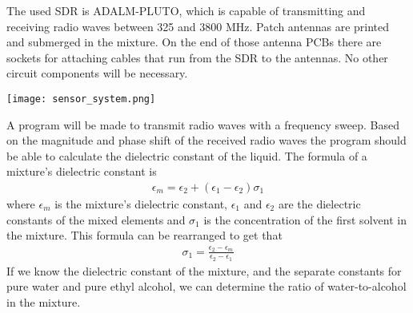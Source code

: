 
The used SDR is ADALM-PLUTO, which is capable of transmitting and receiving radio waves between 325 and 3800 MHz.
Patch antennas are printed and submerged in the mixture.
On the end of those antenna PCBs there are sockets for attaching cables that run from the SDR to the antennas.
No other circuit components will be necessary.

\begin{center}
    \texttt{[image: sensor\_system.png]}
\end{center}

A program will be made to transmit radio waves with a frequency sweep.
Based on the magnitude and phase shift of the received radio waves the program should be able to calculate the dielectric constant of the liquid.
The formula of a mixture's dielectric constant is
\begin{align}
    \epsilon_m = \epsilon_2 + \left( \epsilon_1 - \epsilon_2 \right) \sigma_1
\end{align}
where $\epsilon_m$ is the mixture's dielectric constant, $\epsilon_1$ and $\epsilon_2$ are the dielectric constants of the mixed elements and $\sigma_1$ is the concentration of the first solvent in the mixture.
This formula can be rearranged to get that
\begin{align}
    \sigma_1 = \frac{\epsilon_2 - \epsilon_m}{\epsilon_2 - \epsilon_1}
\end{align}
If we know the dielectric constant of the mixture, and the separate constants for pure water and pure ethyl alcohol, we can determine the ratio of water-to-alcohol in the mixture.